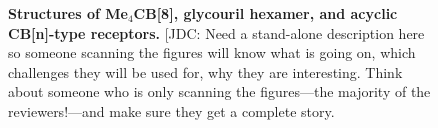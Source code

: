 \documentclass[11pt]{article}
\begin{document}
\begin{figure}[h]
\begin{centering}

\end{centering}

\vspace{0.1in}
\caption{\footnotesize {\bf Structures of Me$_4$CB[8], glycouril hexamer, and acyclic CB[n]-type receptors.}
{\color{red}[JDC: Need a stand-alone description here so someone scanning the figures will know what is going on, which challenges they will be used for, why they are interesting. Think about someone who is only scanning the figures---the majority of the reviewers!---and make sure they get a complete story.}
\label{figure:CB}}
\end{figure}
\end{document}
